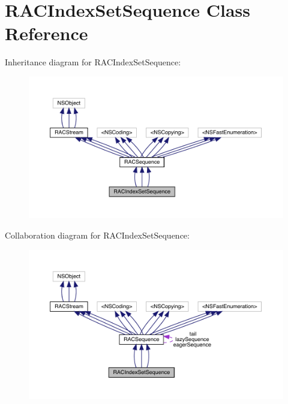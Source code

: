 \hypertarget{interface_r_a_c_index_set_sequence}{}\section{R\+A\+C\+Index\+Set\+Sequence Class Reference}
\label{interface_r_a_c_index_set_sequence}


Inheritance diagram for R\+A\+C\+Index\+Set\+Sequence\+:\nopagebreak
\begin{figure}[H]
\begin{center}
\leavevmode
\includegraphics[width=350pt]{interface_r_a_c_index_set_sequence__inherit__graph}
\end{center}
\end{figure}


Collaboration diagram for R\+A\+C\+Index\+Set\+Sequence\+:\nopagebreak
\begin{figure}[H]
\begin{center}
\leavevmode
\includegraphics[width=350pt]{interface_r_a_c_index_set_sequence__coll__graph}
\end{center}
\end{figure}
